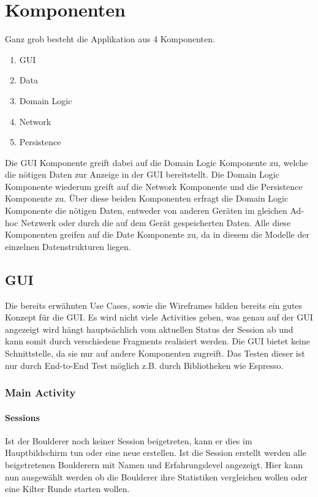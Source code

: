 \documentclass[11pt,a4paper,headsepline,footsepline,bibliography=totocnumbered]{article}
\newcommand{\subsubsubsection}[1]{\paragraph{#1}\mbox{}}
\begin{document}
\section{Komponenten}
  \par
    Ganz grob besteht die Applikation aus 4 Komponenten.
    \begin{enumerate}
      \item GUI
      \item Data
      \item Domain Logic
      \item Network
      \item Persistence
    \end{enumerate}
    Die GUI Komponente greift dabei auf die Domain Logic Komponente zu, welche die nötigen Daten zur Anzeige in der GUI bereitstellt.
    Die Domain Logic Komponente wiederum greift auf die Network Komponente und die Persistence Komponente zu.
    Über diese beiden Komponenten erfragt die Domain Logic Komponente die nötigen Daten, entweder von anderen Geräten im gleichen Ad-hoc Netzwerk oder durch die auf dem Gerät gespeicherten Daten.
    Alle diese Komponenten greifen auf die Date Komponente zu, da in diesem die Modelle der einzelnen Datenstrukturen liegen.

  \subsection{GUI}
    \par
      Die bereits erwähnten Use Cases, sowie die Wireframes bilden bereits ein gutes Konzept für die GUI.
      Es wird nicht viele Activities geben, was genau auf der GUI angezeigt wird hängt hauptsächlich vom aktuellen Status der Session ab und kann somit durch verschiedene Fragments realisiert werden.
      Die GUI bietet keine Schnittstelle, da sie nur auf andere Komponenten zugreift.
      Das Testen dieser ist nur durch End-to-End Test möglich z.B. durch Bibliotheken wie Espresso.

    \subsubsection{Main Activity}

      \subsubsubsection{Sessions}
        \par
          Ist der Boulderer noch keiner Session beigetreten, kann er dies im Hauptbildschirm tun oder eine neue erstellen.
          Ist die Session erstellt werden alle beigetretenen Boulderern mit Namen und Erfahrungslevel angezeigt.
          Hier kann nun ausgewählt werden ob die Boulderer ihre Statistiken vergleichen wollen oder eine Kilter Runde starten wollen.
\end{document}
